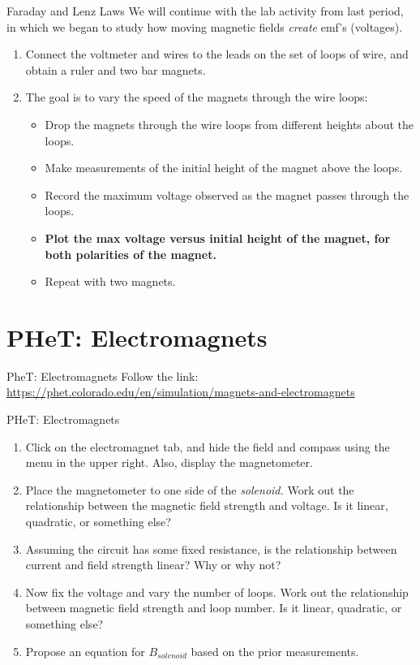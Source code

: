 \documentclass{beamer}
\begin{document}
\begin{frame}{Faraday and Lenz Laws}
\small
We will continue with the lab activity from last period, in which we began to study how moving magnetic fields \textit{create} emf's (voltages).
\begin{enumerate}
\item Connect the voltmeter and wires to the leads on the set of loops of wire, and obtain a ruler and two bar magnets.
\item The goal is to vary the speed of the magnets through the wire loops:
\begin{itemize}
\item Drop the magnets through the wire loops from different heights about the loops.
\item Make measurements of the initial height of the magnet above the loops.
\item Record the maximum voltage observed as the magnet passes through the loops.
\item \alert{\textbf{Plot the max voltage versus initial height of the magnet, for both polarities of the magnet.}}
\item Repeat with two magnets.
\end{itemize}
\end{enumerate}
\end{frame}

\section{PHeT: Electromagnets}

\begin{frame}{PheT: Electromagnets}
Follow the link: \\ \vspace{0.5cm}
\url{https://phet.colorado.edu/en/simulation/magnets-and-electromagnets}
\end{frame}

\begin{frame}{PHeT: Electromagnets}
\small
\begin{enumerate}
\item Click on the electromagnet tab, and hide the field and compass using the menu in the upper right.  Also, display the magnetometer.
\item Place the magnetometer to one side of the \textit{solenoid.}  Work out the relationship between the magnetic field strength and voltage.  Is it linear, quadratic, or something else?
\item Assuming the circuit has some fixed resistance, is the relationship between current and field strength linear?  Why or why not?
\item Now fix the voltage and vary the number of loops.  Work out the relationship between magnetic field strength and loop number.  Is it linear, quadratic, or something else?
\item Propose an equation for $B_{solenoid}$ based on the prior measurements.
\end{enumerate}
\end{frame}
\end{document}
